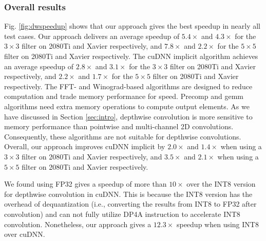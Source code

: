 \subsubsection{Overall results}
 Fig. \ref{fig:dwspeedup} shows that our approach gives the best speedup in nearly all test cases. Our
approach delivers an average speedup of $5.4\times$ and $4.3\times$ for the $3 \times 3$ filter on 2080Ti and Xavier respectively, and
$7.8\times$ and $2.2\times$ for the $5 \times 5$ filter on 2080Ti and Xavier respectively. The cuDNN implicit algorithm achieves an average
speedup of $2.8\times$ and $3.1\times$ for the $3 \times 3$ filter on 2080Ti and Xavier respectively, and $2.2\times$ and $1.7\times$ for
the $5 \times 5$ filter on 2080Ti and Xavier respectively. %
The FFT- and Winograd-based algorithms are designed to reduce computation and trade memory performance for speed. Precomp and gemm
algorithms need extra memory operations to compute output elements. As we have discussed in Section \ref{sec:intro}, depthwise convolution
is more sensitive to memory performance than pointwise and multi-channel 2D convolutions. Consequently, these algorithms are not suitable
for depthwise convolutions. Overall, our approach improves cuDNN implicit by $2.0\times$ and $1.4\times$ when using a $3 \times 3$  filter
on 2080Ti and Xavier respectively, and $3.5\times$ and $2.1\times$ when using a $5 \times 5$ filter on 2080Ti and Xavier respectively.

 We found using FP32 gives a speedup of more than $10\times$ over the INT8 version for depthwise convolution
in cuDNN. This is because the INT8 version has the overhead of dequantization (i.e., converting the results from INT8 to FP32 after
convolution) and can not fully utilize DP4A instruction to accelerate INT8 convolution. Nonetheless, our approach gives a $12.3\times$
speedup when using INT8 over cuDNN.





